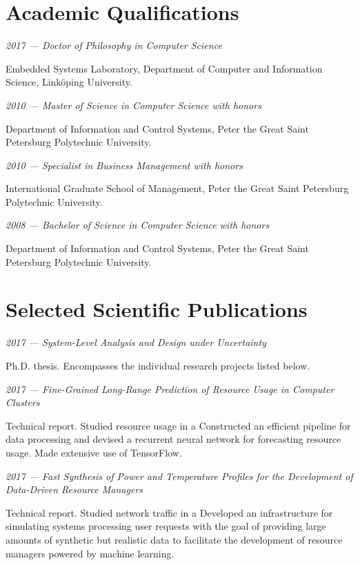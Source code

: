 \documentclass[journal]{IEEEtran}
\begin{document}
\section{Academic Qualifications}
\emph{2017 --- Doctor of Philosophy in Computer Science}

Embedded Systems Laboratory, Department of Computer and Information Science,
Linköping University.

\emph{2010 --- Master of Science in Computer Science with honors}

Department of Information and Control Systems, Peter the Great Saint Petersburg
Polytechnic University.

\emph{2010 --- Specialist in Business Management with honors}

International Graduate School of Management, Peter the Great Saint Petersburg
Polytechnic University.

\emph{2008 --- Bachelor of Science in Computer Science with honors}

Department of Information and Control Systems, Peter the Great Saint Petersburg
Polytechnic University.

\section{Selected Scientific Publications}
\emph{2017 --- System-Level Analysis and Design under Uncertainty}
\cite{ukhov2017d}

Ph.D. thesis. Encompasses the individual research projects listed below.

\emph{2017 --- Fine-Grained Long-Range Prediction of Resource Usage in Computer
Clusters} \cite{ukhov2017b}

Technical report. Studied resource usage in a
 Constructed
an efficient pipeline for data processing and devised a recurrent neural network
for forecasting resource usage. Made extensive use of TensorFlow.

\emph{2017 --- Fast Synthesis of Power and Temperature Profiles for the
Development of Data-Driven Resource Managers} \cite{ukhov2017c}

Technical report. Studied network traffic in a
 Developed an
infrastructure for simulating systems processing user requests with the goal of
providing large amounts of synthetic but realistic data to facilitate the
development of resource managers powered by machine learning.
\end{document}
